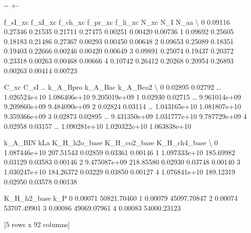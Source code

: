 \documentclass[a4paper,10pt,english]{sphinxmanual}
\newlength\nbsphinxcodecellspacing
\begin{document}
{

\kern-\sphinxverbatimsmallskipamount\kern-\baselineskip
\kern+\FrameHeightAdjust\kern-\fboxrule
\vspace{\nbsphinxcodecellspacing}

\begin{sphinxVerbatim}[commandchars=\\\{\}]
\llap{\color{nbsphinxout}[21]:\,\hspace{\fboxrule}\hspace{\fboxsep}}   f\_sI\_xc  f\_xI\_xc  f\_ch\_xc  f\_pr\_xc  f\_li\_xc     N\_xc      N\_I     N\_aa  \textbackslash{}
0  0.09116  0.27346  0.21535  0.21711  0.27475  0.00251  0.00420  0.00736
1  0.09692  0.25605  0.18183  0.21486  0.27367  0.00293  0.00450  0.00648
2  0.09653  0.25089  0.18351  0.19403  0.22666  0.00246  0.00420  0.00649
3  0.09891  0.25074  0.19437  0.20372  0.23318  0.00263  0.00468  0.00666
4  0.10742  0.26412  0.20268  0.20954  0.26893  0.00263  0.00414  0.00723

      C\_xc     C\_sI  {\ldots}      k\_A\_Bpro       k\_A\_Bac      k\_A\_Bco2  \textbackslash{}
0  0.02895  0.02792  {\ldots}  1.026524e+10  1.086406e+10  9.205019e+09
1  0.02930  0.02715  {\ldots}  9.961014e+09  9.209860e+09  9.484090e+09
2  0.02824  0.03114  {\ldots}  1.043165e+10  1.081807e+10  9.359366e+09
3  0.02873  0.02895  {\ldots}  9.431350e+09  1.031777e+10  9.787729e+09
4  0.02958  0.03157  {\ldots}  1.090281e+10  1.020322e+10  1.063838e+10

        k\_A\_BIN        kLa  K\_H\_h2o\_base  K\_H\_co2\_base  K\_H\_ch4\_base  \textbackslash{}
0  1.087446e+10  207.51543       0.02859       0.03361       0.00146
1  1.097333e+10  185.69982       0.03129       0.03583       0.00146
2  9.475087e+09  218.85580       0.02930       0.03748       0.00140
3  1.030247e+10  184.26372       0.03229       0.03850       0.00127
4  1.076841e+10  189.12319       0.02950       0.03578       0.00138

   K\_H\_h2\_base          k\_P
0      0.00071  50821.70460
1      0.00079  45097.70847
2      0.00074  53707.49901
3      0.00086  49069.07961
4      0.00083  54000.23123

[5 rows x 92 columns]
\end{sphinxVerbatim}
}

{
\begin{sphinxVerbatim}[commandchars=\\\{\}]
\llap{\color{nbsphinxin}[22]:\,\hspace{\fboxrule}\hspace{\fboxsep}}
\PYG{p}{[}\PYG{p}{]} 
\end{sphinxVerbatim}
}
\end{document}
